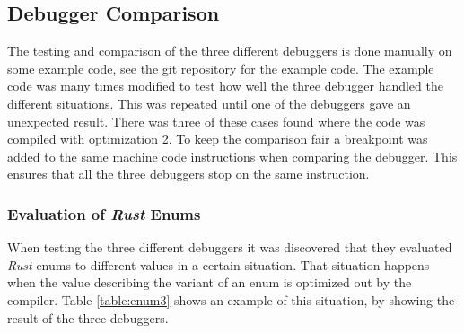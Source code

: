\subsection{Debugger Comparison}
\label{sec:debuggercomparison}



The testing and comparison of the three different debuggers is done manually on some example code, see the git repository \cite{example-code} for the example code.
The example code was many times modified to test how well the three debugger handled the different situations.
This was repeated until one of the debuggers gave an unexpected result.
There was three of these cases found where the code was compiled with optimization 2.
To keep the comparison fair a breakpoint was added to the same machine code instructions when comparing the debugger.
This ensures that all the three debuggers stop on the same instruction.


\subsubsection{Evaluation of \emph{Rust} Enums}
When testing the three different debuggers it was discovered that they evaluated \emph{Rust} enums to different values in a certain situation.
That situation happens when the value describing the variant of an enum is optimized out by the compiler.
Table \ref{table:enum3} shows an example of this situation, by showing the result of the three debuggers.

